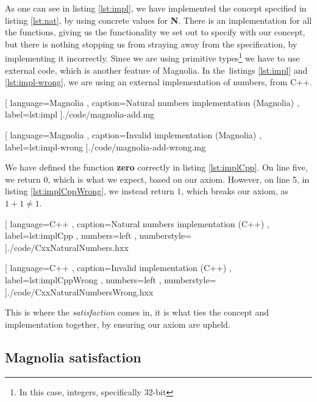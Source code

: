 As one can see in listing \ref{lst:impl}, we have implemented the concept
specified in listing \ref{lst:nat}, by using concrete values for \textbf{N}.
There is an implementation for all the functions, giving us the functionality we
set out to specify with our concept, but there is nothing stopping us from
straying away from the specification, by implementing it incorrectly. Since we
are using primitive types\footnote{In this case, integers, specifically 32-bit}
we have to use external code, which is another feature of Magnolia. In the\
listings \ref{lst:impl} and \ref{lst:impl-wrong}, we are using an external
implementation of numbers, from C++.

\begin{code}[H]
  
    [ language=Magnolia
    , caption={Natural numbers implementation (Magnolia)}
    , label=lst:impl
    ]{./code/magnolia-add.mg}
\end{code}

\begin{code}[H]
  
    [ language=Magnolia
    , caption={Invalid implementation (Magnolia)}
    , label=lst:impl-wrong
    ]{./code/magnolia-add-wrong.mg}
\end{code}

We have defined the function \textbf{zero} correctly in listing
\ref{lst:implCpp}. On line five, we return $0$, which is what we expect, based
on our axiom. However, on line 5, in listing \ref{lst:implCppWrong}, we instead
return $1$, which breaks our axiom, as $1 + 1 \neq 1$.

\begin{code}[H]
  
    [ language=C++
    , caption={Natural numbers implementation (C++)}
    , label=lst:implCpp
    , numbers=left
    , numberstyle=\tiny\color{gray}
    ]{./code/CxxNaturalNumbers.hxx}
\end{code}

\begin{code}[H]
  
    [ language=C++
    , caption={Invalid implementation (C++)}
    , label=lst:implCppWrong
    , numbers=left
    , numberstyle=\tiny\color{gray}
    ]{./code/CxxNaturalNumbersWrong.hxx}
\end{code}

This is where the
\textit{satisfaction} comes in, it is what ties the concept and implementation
together, by ensuring our axiom are upheld.

\subsection{Magnolia satisfaction}

